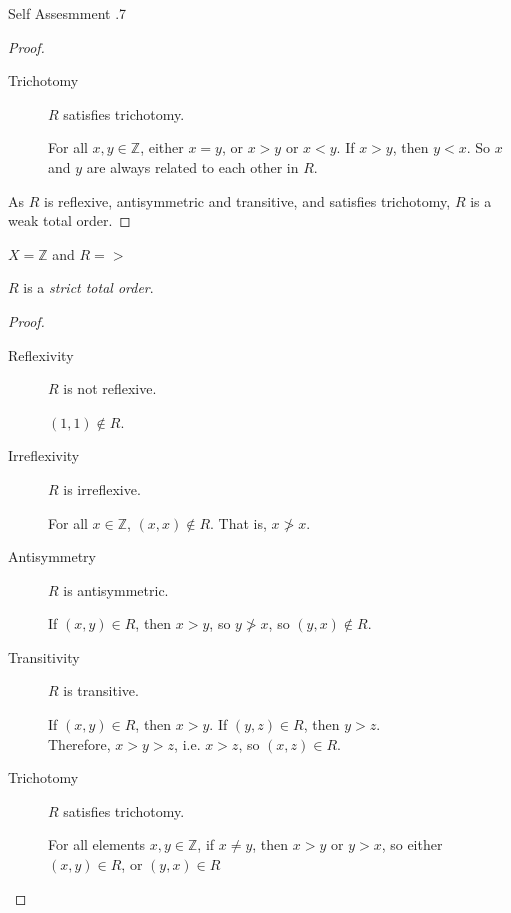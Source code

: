 \documentclass[\main/notes.tex]{subfiles}
\begin{document}
\begin{exercise}{Self Assesmment \thechapter.7}
\begin{questions}
\begin{answer}
\begin{proof}
\begin{description}
\begin{subproof}
											\end{subproof}
										\item[Trichotomy] $R$ satisfies trichotomy.
											\begin{subproof}
												For all $x, y \in \mathbb{Z}$, either $x = y$, or $x > y$ or $x < y$. If $x > y$, then $y < x$. So $x$ and $y$ are always related to each other in $R$.
											\end{subproof}
									\end{description}
									As $R$ is reflexive, antisymmetric and transitive, and satisfies trichotomy, $R$ is a weak total order.
								\end{proof}
							\end{answer}
						\item $X = \mathbb{Z}$ and $R = >$\\
							\begin{answer}
								$R$ is a \emph{strict total order}.
								\begin{proof}
									$ $
									\begin{description}
										\item[Reflexivity] $R$ is not reflexive.
											\begin{subproof}[Counterexample]
												$(1, 1) \notin R$.
											\end{subproof}
										\item[Irreflexivity] $R$ is irreflexive.
											\begin{subproof}
												For all $x \in \mathbb{Z}$, $(x, x) \notin R$. That is, $x \not > x$.
											\end{subproof}
										\item[Antisymmetry] $R$ is antisymmetric.
											\begin{subproof}
												If $(x, y) \in R$, then $x > y$, so $y \not > x$, so $(y, x) \notin R$.
											\end{subproof}
										\item[Transitivity] $R$ is transitive.
											\begin{subproof}
												If $(x, y) \in R$, then $x > y$. If $(y, z) \in R$, then $y > z$.\\
												Therefore, $x > y > z$, i.e. $x > z$, so $(x, z) \in R$.
											\end{subproof}
										\item[Trichotomy] $R$ satisfies trichotomy.
											\begin{subproof}
												For all elements $x, y \in \mathbb{Z}$, if $x \neq y$, then $x > y$ or $y > x$, so either $(x, y) \in R$, or $(y, x) \in R$

\end{subproof}
\end{description}
\end{proof}
\end{answer}
\end{questions}
\end{exercise}
\end{document}
